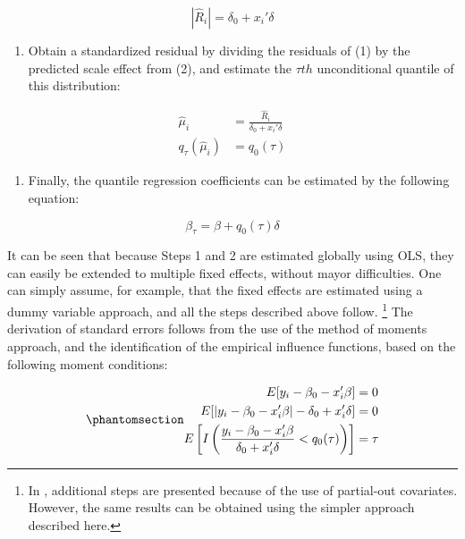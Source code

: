 \documentclass[bib]{statapress}
\providecommand{\tightlist}{%
  \setlength{\itemsep}{0pt}\setlength{\parskip}{0pt}}\usepackage{longtable,booktabs,array}
\begin{document}
\[|\hat R_i| = \delta_0 + x_{i}' \delta\]

\begin{enumerate}
\def\labelenumi{\arabic{enumi}.}
\setcounter{enumi}{2}
\tightlist
\item
  Obtain a standardized residual by dividing the residuals of (1) by the
  predicted scale effect from (2), and estimate the \(\tau th\)
  unconditional quantile of this distribution:
\end{enumerate}

\[\begin{aligned}
\hat \mu_i &= \frac{\hat R_i}{\delta_0 + x_{i}' \delta} \\
q_{\tau}(\hat \mu_i) &= q_0(\tau)
\end{aligned}
\]

\begin{enumerate}
\def\labelenumi{\arabic{enumi}.}
\setcounter{enumi}{3}
\tightlist
\item
  Finally, the quantile regression coefficients can be estimated by the
  following equation:
\end{enumerate}

\[\beta_{\tau} = \beta + q_0(\tau) \delta
\]

It can be seen that because Steps 1 and 2 are estimated globally using
OLS, they can easily be extended to multiple fixed effects, without
mayor difficulties. One can simply assume, for example, that the fixed
effects are estimated using a dummy variable approach, and all the steps
described above follow. \footnote{In \citet{riosavila2024}, additional
  steps are presented because of the use of partial-out covariates.
  However, the same results can be obtained using the simpler approach
  described here.} The derivation of standard errors follows from the
use of the method of moments approach, and the identification of the
empirical influence functions, based on the following moment conditions:

\begin{equation}\phantomsection\label{eq-mmqreg-moments}{\begin{aligned}
E[y_{i} - \beta_0 - x_{i}' \beta] &= 0 \\
E[|y_{i} - \beta_0 - x_{i}' \beta|- \delta_0 + x_{i}' \delta] &= 0 \\
E\left[ I\left(\frac{y_{i} - \beta_0 - x_{i}' \beta}{\delta_0 + x_{i}' \delta} < q_0(\tau)\right) \right] &= \tau
\end{aligned}
}\end{equation}
\end{document}
